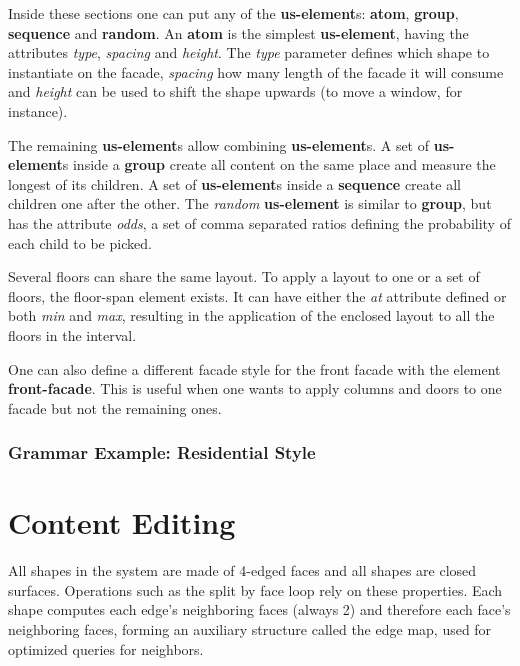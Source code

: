 Inside these sections one can put any of the \textbf{us-element}s: \textbf{atom}, \textbf{group}, \textbf{sequence} and \textbf{random}.
An \textbf{atom} is the simplest \textbf{us-element}, having the attributes
\emph{type}, \emph{spacing} and \emph{height}.
The \emph{type} parameter defines which shape to instantiate on the facade,
\emph{spacing} how many length of the facade it will consume and
\emph{height} can be used to shift the shape upwards (to move a window, for instance).

The remaining \textbf{us-element}s allow combining \textbf{us-element}s.
A set of \textbf{us-element}s inside a \textbf{group} create all content on the same place and measure the longest of its children.
A set of \textbf{us-element}s inside a \textbf{sequence} create all children one after the other.
The \emph{random} \textbf{us-element} is similar to \textbf{group}, but has the attribute \emph{odds},
a set of comma separated ratios defining the probability of each child to be picked.

Several floors can share the same layout. To apply a layout to one or a set of floors, the floor-span element exists.
It can have either the \emph{at} attribute defined or both \emph{min} and \emph{max},
resulting in the application of the enclosed layout to all the floors in the interval.

One can also define a different facade style for the front facade with the element \textbf{front-facade}.
This is useful when one wants to apply columns and doors to one facade but not the remaining ones.




%

\subsubsection{Grammar Example: Residential Style}



\section{Content Editing}

All shapes in the system are made of 4-edged faces and all shapes are closed surfaces.
Operations such as the split by face loop rely on these properties.
Each shape computes each edge's neighboring faces (always 2)
and therefore each face's neighboring faces, forming an auxiliary structure called the edge map,
used for optimized queries for neighbors.

